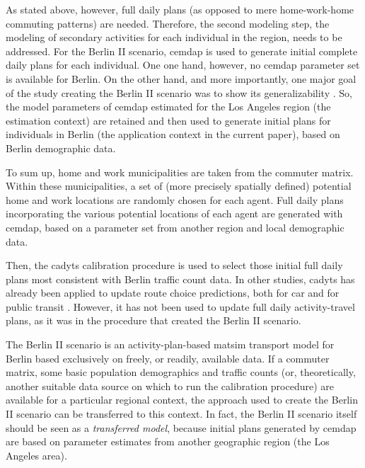 As stated above, however, full daily plans (as opposed to mere home-work-home commuting patterns) are needed. Therefore, the second modeling step, the modeling of secondary activities for each individual in the region, needs to be addressed. For the Berlin II scenario, \gls{cemdap} is used to generate initial complete daily plans for each individual. One one hand, however, no \gls{cemdap} parameter set is available for Berlin. On the other hand, and more importantly, one major goal of the study creating the Berlin II scenario was to show its generalizability \citep{ZiemkeNagelBhat2015IntegratingCemdapMatsimTransferabilityTRB}. So, the model parameters of \gls{cemdap} estimated for the Los Angeles region (the estimation context) are retained and then used to generate initial plans for individuals in Berlin (the application context in the current paper), based on Berlin demographic data.

To sum up, home and work municipalities are taken from the commuter matrix. Within these municipalities, a set of (more precisely spatially defined) potential home and work locations are randomly chosen for each agent. Full daily plans incorporating the various potential locations of each agent are generated with \gls{cemdap}, based on a parameter set from another region and local demographic data.

Then, the \gls{cadyts} calibration procedure is used to select those initial full daily plans most consistent with Berlin traffic count data. In other studies, \gls{cadyts} has already been applied to update route choice predictions, both for car \citep{FloetteroedChenEtAl2011BehavioralCalibAndAnaNETS} and for public transit \citep{MoyoNagel2013ptNetCalibrationABMTPO}. However, it has not been used to update full daily activity-travel plans, as it was in the procedure that created the Berlin II scenario. 

The Berlin II scenario is an activity-plan-based \gls{matsim} transport model for Berlin based exclusively on freely, or readily, available data. If a commuter matrix, some basic population demographics and traffic counts (or, theoretically, another suitable data source on which to run the calibration procedure) are available for a particular regional context, the approach used to create the Berlin II scenario can be transferred to this context. In fact, the Berlin II scenario itself should be seen as a \emph{transferred model}, because initial plans generated by \gls{cemdap} are based on parameter estimates from another geographic region (the Los Angeles area).

